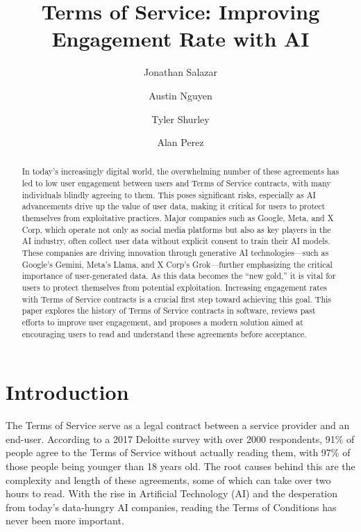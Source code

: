 \documentclass[sigconf, nonacm]{acmart}
\begin{document}
\title{Terms of Service: Improving Engagement Rate with AI}

\author{Jonathan Salazar}

\author{Austin Nguyen}
\author{Tyler Shurley}
\author{Alan Perez}

\begin{abstract}
In today's increasingly digital world, the overwhelming number of these agreements has led to low user engagement between users and Terms of Service contracts, with many individuals blindly agreeing to them. This poses significant risks, especially as AI advancements drive up the value of user data, making it critical for users to protect themselves from exploitative practices. Major companies such as Google, Meta, and X Corp, which operate not only as social media platforms but also as key players in the AI industry, often collect user data without explicit consent to train their AI models. These companies are driving innovation through generative AI technologies—such as Google’s Gemini, Meta’s Llama, and X Corp’s Grok—further emphasizing the critical importance of user-generated data. As this data becomes the “new gold,” it is vital for users to protect themselves from potential exploitation. Increasing engagement rates with Terms of Service contracts is a crucial first step toward achieving this goal.  This paper explores the history of Terms of Service contracts in software, reviews past efforts to improve user engagement, and proposes a modern solution aimed at encouraging users to read and understand these agreements before acceptance.
\end{abstract}

\maketitle

\section{Introduction}
The Terms of Service serve as a legal contract between a service provider and an end-user. According to a 2017 Deloitte survey with over 2000 respondents, 91\% of people agree to the Terms of Service without actually reading them, with 97\% of those people being younger than 18 years old. The root causes behind this are the complexity and length of these agreements, some of which can take over two hours to read. With the rise in Artificial Technology (AI) and the desperation from today's data-hungry AI companies, reading the Terms of Conditions has never been more important.
\end{document}

